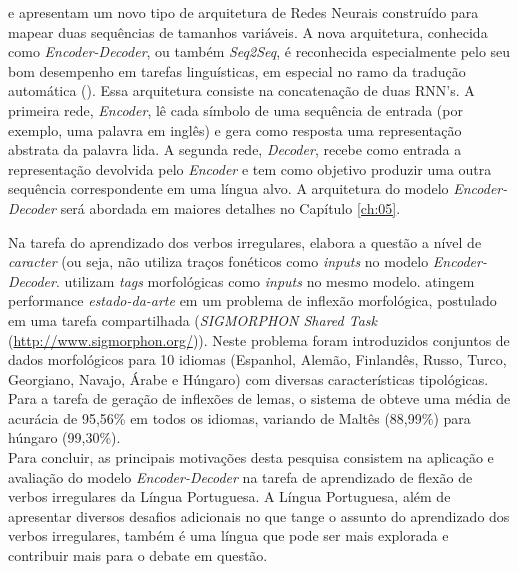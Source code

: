 \cite{enc-dec:2014} e \cite{seq2seq:2014} apresentam um novo tipo de arquitetura de Redes Neurais construído para mapear duas sequências de tamanhos variáveis. A nova arquitetura, conhecida como \textit{Encoder-Decoder}, ou também \textit{Seq2Seq}, é reconhecida especialmente pelo seu bom desempenho em tarefas linguísticas, em especial no ramo da tradução automática (\cite{Wu:2016}). Essa arquitetura consiste na concatenação de duas RNN's. A primeira rede, \textit{Encoder}, lê cada símbolo de uma sequência de entrada (por exemplo, uma palavra em inglês) e gera como resposta uma representação abstrata da palavra lida. A segunda rede, \textit{Decoder}, recebe como entrada a representação devolvida pelo \textit{Encoder} e tem como objetivo produzir uma outra sequência correspondente em uma língua alvo. A arquitetura do modelo \textit{Encoder-Decoder} será abordada em maiores detalhes no Capítulo \ref{ch:05}.

Na tarefa do aprendizado dos verbos irregulares, \cite{faruqui:2015} elabora a questão a nível de \textit{caracter} (ou seja, não utiliza traços fonéticos como \textit{inputs} no modelo \textit{Encoder-Decoder}. \cite{kann-schutze-2016-med} utilizam \textit{tags} morfológicas como \textit{inputs} no mesmo modelo. \cite{cotterell-sigmorphon2016} atingem performance \textit{estado-da-arte} em um problema de inflexão morfológica, postulado em uma tarefa compartilhada (\textit{SIGMORPHON Shared Task} (\url{http://www.sigmorphon.org/})). Neste problema foram introduzidos conjuntos de dados morfológicos para 10 idiomas (Espanhol, Alemão, Finlandês, Russo, Turco, Georgiano, Navajo, Árabe e Húngaro) com diversas características tipológicas. Para a tarefa de geração de inflexões de lemas, o sistema de \cite{cotterell-sigmorphon2016} obteve uma média de acurácia de 95,56\% em todos os idiomas, variando de
Maltês (88,99\%) para húngaro (99,30\%).\\

Para concluir, as principais motivações desta pesquisa consistem na aplicação e avaliação do modelo \textit{Encoder-Decoder} na tarefa de aprendizado de flexão de verbos irregulares da Língua Portuguesa. A Língua Portuguesa, além de apresentar diversos desafios adicionais no que tange o assunto do aprendizado dos verbos irregulares, também é uma língua que pode ser mais explorada e contribuir mais para o debate em questão.  

